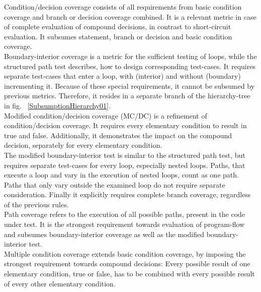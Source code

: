 	Condition/decision coverage consists of all requirements from basic condition coverage and branch or decision coverage combined. It is a relevant metric in case of complete evaluation of compound decisions, in contrast to short-circuit evaluation. It subsumes statement, branch or decision and basic condition coverage. \\
	
	Boundary-interior coverage is a metric for the sufficient testing of loops, while the structured path test describes, how to design corresponding test-cases. It requires separate test-cases that enter a loop, with (interior) and without (boundary) incrementing it.	Because of these special requirements, it cannot be subsumed by previous metrics. Therefore, it resides in a separate branch of the hierarchy-tree in fig. ~\ref{SubsumptionHierarchy01}. \\

	Modified condition/decision coverage (MC/DC) is a refinement of condition/decision coverage. It requires every elementary condition to result in true and false. Additionally, it  demonstrates the impact on the compound decision, separately for every elementary condition. 	\\

	The modified boundary-interior test is similar to the structured path test, but requires separate test-cases for every loop, especially nested loops. Paths, that execute a loop and vary in the execution of nested loops, count as one path. Paths that only vary outside the examined loop do not require separate consideration. Finally it explicitly requires complete branch coverage, regardless of the previous rules. \\

	Path coverage refers to the execution of all possible paths, present in the code under test. It is the strongest requirement towards evaluation of program-flow and subsumes boundary-interior coverage as well as the modified boundary-interior test.  \\


	Multiple condition coverage extends basic condition coverage, by imposing the strongest requirement towards compound decisions: Every possible result of one elementary condition, true or false, has to be combined with every possible result of every other elementary condition. \\


